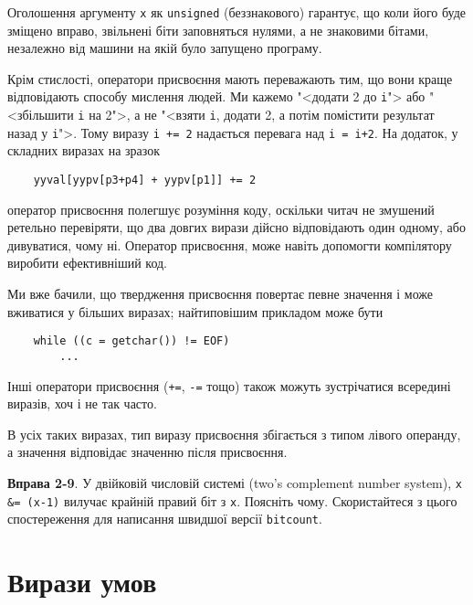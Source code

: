 \documentclass[a4paper,12pt]{book}
\begin{document}
  Оголошення аргументу \texttt{x} як \texttt{unsigned} (беззнакового) гарантує, що коли
  його буде зміщено вправо, звільнені біти заповняться нулями, а не знаковими бітами,
  незалежно від машини на якій було запущено програму.

  Крім стислості, оператори присвоєння мають переважають тим, що вони краще відповідають
  способу мислення людей. Ми кажемо "<додати 2 до \texttt{i}"> або
  "<збільшити \texttt{i} на 2">, а не "<взяти \texttt{i}, додати 2, а потім
  помістити результат назад у \texttt{i}">. Тому виразу \texttt{i += 2} надається
  перевага над \texttt{i = i+2}. На додаток, у складних виразах на зразок
  \begin{verbatim}
    yyval[yypv[p3+p4] + yypv[p1]] += 2
  \end{verbatim}
  оператор присвоєння полегшує розуміння коду, оскільки читач не змушений ретельно
  перевіряти, що два довгих вирази дійсно відповідають один одному, або дивуватися, чому
  ні. Оператор присвоєння, може навіть допомогти компілятору виробити ефективніший код.

  Ми вже бачили, що твердження присвоєння повертає певне значення і може вживатися у
  більших виразах; найтиповішим прикладом може бути
  \begin{verbatim}
    while ((c = getchar()) != EOF)
        ...
  \end{verbatim}

  Інші оператори присвоєння (\texttt{+=}, \texttt{-=} тощо) також можуть зустрічатися
  всередині виразів, хоч і не так часто.

  В усіх таких виразах, тип виразу присвоєння збігається з типом лівого операнду, а
  значення відповідає значенню після присвоєння.

  \textbf{Вправа 2-9}. У двійковій числовій системі (two's complement number system), \texttt{x
  \&= (x-1)} вилучає крайній правий біт з \texttt{x}. Поясніть чому. Скористайтеся
  з цього спостереження для написання швидшої версії \texttt{bitcount}.

\section{Вирази умов}
\end{document}
